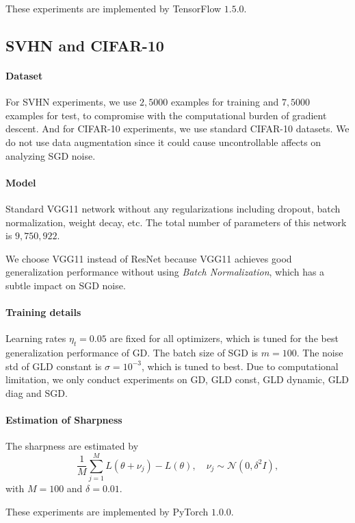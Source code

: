 \documentclass{article}
\begin{document}
These experiments are implemented by TensorFlow $1.5.0$.

\subsection{SVHN and CIFAR-10}
\paragraph{Dataset}
For SVHN experiments, we use $2,5000$ examples for training and $7,5000$ examples for test, to compromise with the computational burden of gradient descent.
And for CIFAR-10 experiments, we use standard CIFAR-10 datasets.
We do not use data augmentation since it could cause uncontrollable affects on analyzing SGD noise.

\paragraph{Model}
Standard VGG11 network without any regularizations including dropout, batch normalization, weight decay, etc.
The total number of parameters of this network is $9,750,922$.

We choose VGG11 instead of ResNet because VGG11 achieves good generalization performance without using \emph{Batch Normalization}, which has a subtle impact on SGD noise.

\paragraph{Training details}
Learning rates $\eta_t=0.05$ are fixed for all optimizers, which is tuned for the best generalization performance of GD.
The batch size of SGD is $m=100$.
The noise std of GLD constant is $\sigma=10^{-3}$, which is tuned to best.
Due to computational limitation, we only conduct experiments on GD, GLD const, GLD dynamic, GLD diag and SGD.

\paragraph{Estimation of Sharpness}
The sharpness are estimated by
\begin{equation}
\frac{1}{M} \sum_{j=1}^M L(\theta+\nu_j) - L(\theta),\quad \nu_j \sim \mathcal{N}(0,\delta^2I),
\end{equation}
with $M=100$ and $\delta=0.01$.

These experiments are implemented by PyTorch $1.0.0$.
\end{document}
